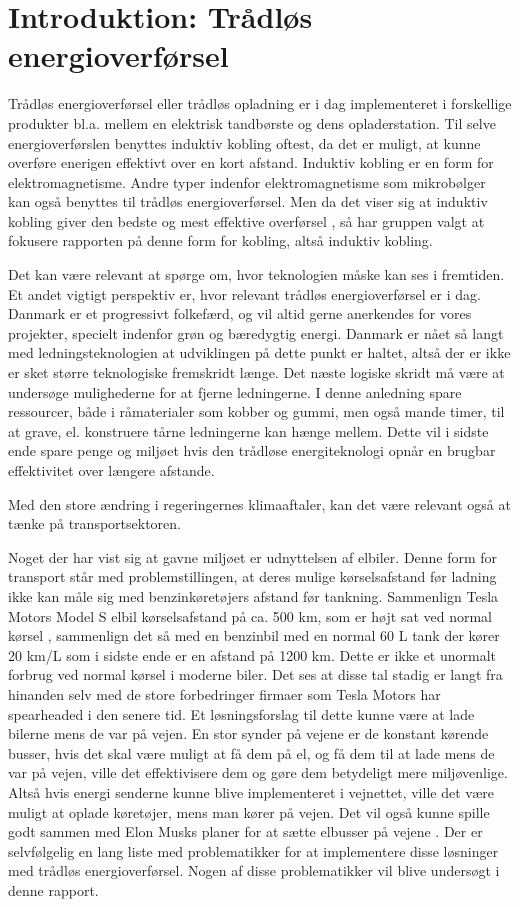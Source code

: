 \section{Introduktion: Trådløs energioverførsel}

Trådløs energioverførsel eller trådløs opladning er i dag implementeret i forskellige produkter bl.a. mellem en elektrisk tandbørste og dens opladerstation. Til selve energioverførslen benyttes induktiv kobling oftest, da det er muligt, at kunne overføre enerigen effektivt over en kort afstand. Induktiv kobling er en form for elektromagnetisme. Andre typer indenfor elektromagnetisme som mikrobølger kan også benyttes til trådløs energioverførsel. Men da det viser sig at induktiv kobling giver den bedste og mest effektive overførsel \cite{mit}, så har gruppen valgt at fokusere rapporten på denne form for kobling, altså induktiv kobling.

Det kan være relevant at spørge om, hvor teknologien måske kan ses i fremtiden. Et andet vigtigt perspektiv er, hvor relevant trådløs energioverførsel er i dag. Danmark er et progressivt folkefærd, og vil altid gerne anerkendes for vores projekter, specielt indenfor grøn og bæredygtig energi. Danmark er nået så langt med ledningsteknologien at udviklingen på dette punkt er haltet, altså der er ikke er sket større teknologiske fremskridt længe. Det næste logiske skridt må være at undersøge mulighederne for at fjerne ledningerne. I denne anledning spare ressourcer, både i råmaterialer som kobber og gummi, men også mande timer, til at grave, el. konstruere tårne ledningerne kan hænge mellem. Dette vil i sidste ende spare penge og miljøet hvis den trådløse energiteknologi opnår en brugbar effektivitet over længere afstande.

Med den store ændring i regeringernes klimaaftaler, kan det være relevant også at tænke på transportsektoren.

Noget der har vist sig at gavne miljøet er udnyttelsen af elbiler. Denne form for transport står med problemstillingen, at deres mulige kørselsafstand før ladning ikke kan måle sig med benzinkøretøjers afstand før tankning. Sammenlign Tesla Motors Model S elbil kørselsafstand på ca. 500  km, som er højt sat ved normal kørsel \cite{tesla}, sammenlign det så med en benzinbil med en normal 60 L tank der kører 20 km/L som i sidste ende er en afstand på  1200 km. Dette er ikke et unormalt forbrug ved normal kørsel i moderne biler. Det ses at disse tal stadig er langt fra hinanden selv med de store forbedringer firmaer som Tesla Motors har spearheaded i den senere tid.
Et løsningsforslag til dette kunne være at lade bilerne mens de var på vejen. En stor synder på vejene er de konstant kørende busser, hvis det skal være muligt at få dem på el, og få dem til at lade mens de var på vejen, ville det effektivisere dem og gøre dem betydeligt mere miljøvenlige. Altså hvis energi senderne kunne blive implementeret i vejnettet, ville det være muligt at oplade køretøjer, mens man kører på vejen. Det vil også kunne spille godt sammen med Elon Musks planer for at sætte elbusser på vejene \cite{tesla}. Der er selvfølgelig en lang liste med problematikker for at implementere disse løsninger med trådløs energioverførsel. Nogen af disse problematikker vil blive undersøgt i denne rapport.

